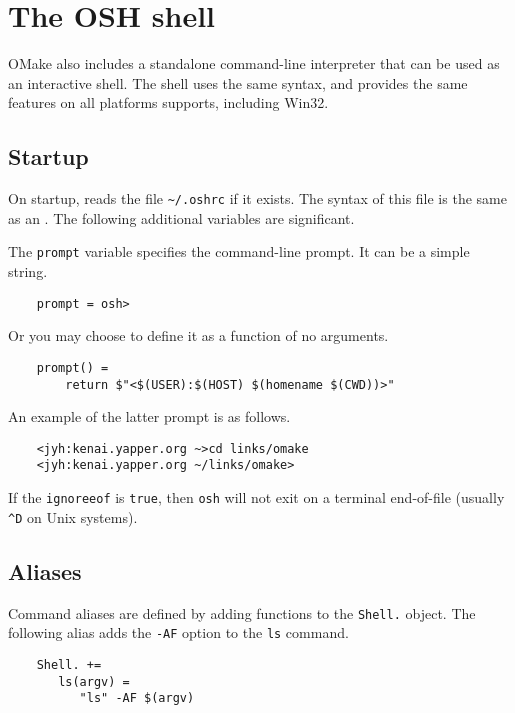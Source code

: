 %
%
%
\chapter{The OSH shell}
\label{chapter:osh}

OMake also includes a standalone command-line interpreter  that can be used as an
interactive shell.  The shell uses the same syntax, and provides the same features on all platforms
 supports, including Win32.

\section{Startup}

On startup,  reads the file \verb+~/.oshrc+ if it exists.  The syntax of this file is the
same as an .  The following additional variables are significant.

  The \verb+prompt+ variable specifies the command-line prompt.
It can be a simple string.

\begin{verbatim}
    prompt = osh>
\end{verbatim}

Or you may choose to define it as a function of no arguments.

\begin{verbatim}
    prompt() =
        return $"<$(USER):$(HOST) $(homename $(CWD))>"
\end{verbatim}

An example of the latter prompt is as follows.

\begin{verbatim}
    <jyh:kenai.yapper.org ~>cd links/omake
    <jyh:kenai.yapper.org ~/links/omake>
\end{verbatim}

   If the \verb+ignoreeof+ is \verb+true+, then \verb+osh+ will not exit on
   a terminal end-of-file (usually \verb+^D+ on Unix systems).

\section{Aliases}

Command aliases are defined by adding functions to the \verb+Shell.+ object.  The following alias
adds the \verb+-AF+ option to the \verb+ls+ command.

\begin{verbatim}
    Shell. +=
       ls(argv) =
          "ls" -AF $(argv)
\end{verbatim}

